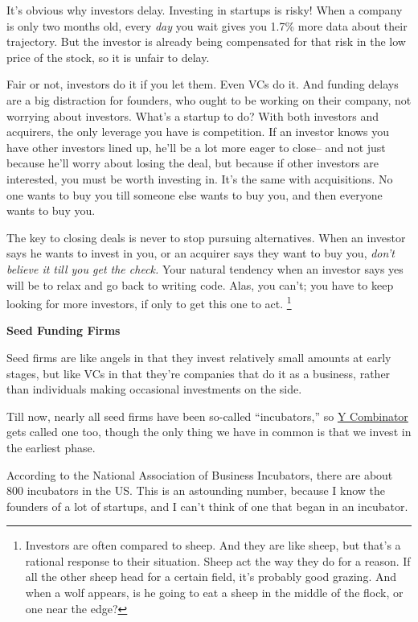 It's obvious why investors delay. Investing in startups is risky! When a
company is only two months old, every \emph{day} you wait gives you
1.7\% more data about their trajectory. But the investor is already
being compensated for that risk in the low price of the stock, so it is
unfair to delay.

Fair or not, investors do it if you let them. Even VCs do it. And
funding delays are a big distraction for founders, who ought to be
working on their company, not worrying about investors. What's a startup
to do? With both investors and acquirers, the only leverage you have is
competition. If an investor knows you have other investors lined up,
he'll be a lot more eager to close-- and not just because he'll worry
about losing the deal, but because if other investors are interested,
you must be worth investing in. It's the same with acquisitions. No one
wants to buy you till someone else wants to buy you, and then everyone
wants to buy you.

The key to closing deals is never to stop pursuing alternatives. When an
investor says he wants to invest in you, or an acquirer says they want
to buy you, \emph{don't believe it till you get the check.} Your natural
tendency when an investor says yes will be to relax and go back to
writing code. Alas, you can't; you have to keep looking for more
investors, if only to get this one to act. \footnote{Investors are often compared to sheep. And they are like sheep,
but that's a rational response to their situation. Sheep act the way
they do for a reason. If all the other sheep head for a certain field,
it's probably good grazing. And when a wolf appears, is he going to eat
a sheep in the middle of the flock, or one near the edge?}

\textbf{Seed Funding Firms}

Seed firms are like angels in that they invest relatively small amounts
at early stages, but like VCs in that they're companies that do it as a
business, rather than individuals making occasional investments on the
side.

Till now, nearly all seed firms have been so-called ``incubators,'' so
\href{http://ycombinator.com}{Y Combinator} gets called one too, though
the only thing we have in common is that we invest in the earliest
phase.

According to the National Association of Business Incubators, there are
about 800 incubators in the US. This is an astounding number, because I
know the founders of a lot of startups, and I can't think of one that
began in an incubator.

